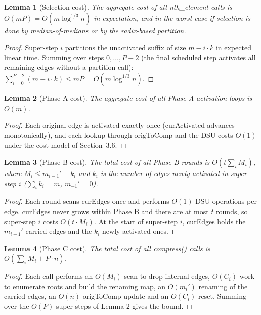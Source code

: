 \documentclass[11pt]{article}
\theoremstyle{plain}
\newtheorem{lemma}{Lemma}
\theoremstyle{remark}
\begin{document}
\begin{lemma}[Selection cost]
The aggregate cost of all nth\_element calls is
\(O(mP) = O(m\log^{1/3} n)\) in expectation, and in the worst case if
selection is done by median-of-medians or by the radix-based partition.
\end{lemma}

\begin{proof}
Super-step \(i\) partitions the unactivated suffix of size
\(m - i\cdot k\) in expected linear time. Summing over steps
\(0,\dots,P-2\) (the final scheduled step activates all remaining edges
without a partition call):
\(\sum_{i=0}^{P-2}(m - i\cdot k) \le mP = O(m\log^{1/3} n)\).
\end{proof}

\begin{lemma}[Phase A cost]
The aggregate cost of all Phase A activation loops is \(O(m)\).
\end{lemma}

\begin{proof}
Each original edge is activated exactly once (curActivated advances
monotonically), and each lookup through origToComp and the DSU costs
\(O(1)\) under the cost model of Section~3.6.
\end{proof}

\begin{lemma}[Phase B cost]
The total cost of all Phase B rounds is \(O\!\left(t \sum_i M_i\right)\),
where \(M_i \le m_{i-1}' + k_i\) and \(k_i\) is the number of edges
newly activated in super-step \(i\) (\(\sum_i k_i = m\),
\(m_{-1}' = 0\)).
\end{lemma}

\begin{proof}
Each round scans curEdges once and performs \(O(1)\) DSU operations per
edge. curEdges never grows within Phase B and there are at most \(t\)
rounds, so super-step \(i\) costs \(O(t \cdot M_i)\). At the start of
super-step \(i\), curEdges holds the \(m_{i-1}'\) carried edges and the
\(k_i\) newly activated ones.
\end{proof}

\begin{lemma}[Phase C cost]
The total cost of all compress() calls is
\(O\!\left(\sum_i M_i + P\cdot n\right)\).
\end{lemma}

\begin{proof}
Each call performs an \(O(M_i)\) scan to drop internal edges, \(O(C_i)\)
work to enumerate roots and build the renaming map, an \(O(m_i')\)
renaming of the carried edges, an \(O(n)\) origToComp update and an
\(O(C_i)\) reset. Summing over the \(O(P)\) super-steps of Lemma 2 gives
the bound.
\end{proof}
\end{document}
